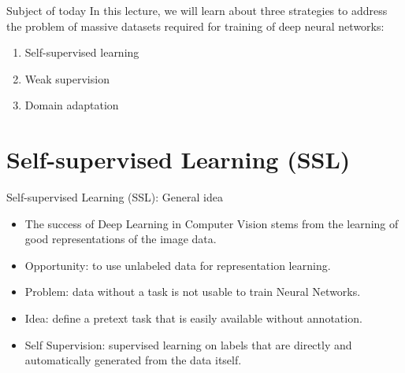 \documentclass[xcolor=pdftex,dvipsnames,table]{beamer}
\begin{document}
\begin{frame}{Subject of today}
In this lecture, we will learn about three strategies to address the problem of massive datasets required for training of deep neural networks:
\begin{enumerate}
\item Self-supervised learning
\item Weak supervision
\item Domain adaptation
\end{enumerate}
\end{frame}

\section{Self-supervised Learning (SSL)}

\begin{frame}{Self-supervised Learning (SSL): General idea}
\begin{itemize}
\item The success of Deep Learning in Computer Vision stems from the learning of good representations of the image data. 
\item Opportunity: to use unlabeled data for representation learning.
\item Problem: data without a task is not usable to train Neural Networks.
\item Idea: define a pretext task that is easily available without annotation. 
\item Self Supervision: supervised learning on labels that are directly and automatically generated from the data itself. 
\end{itemize}
\end{frame}
\end{document}
